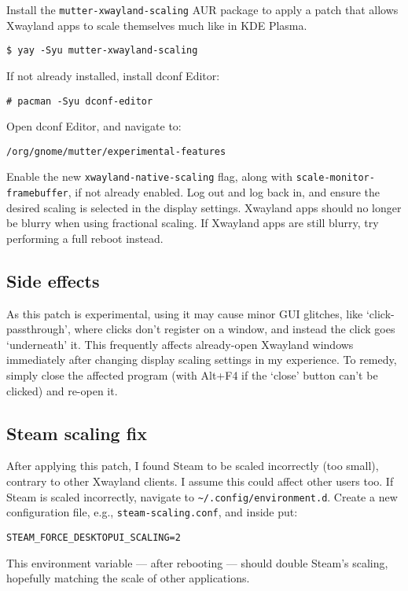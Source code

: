\documentclass[a4paper]{article}
\begin{document}
Install the \lstinline|mutter-xwayland-scaling| AUR package to apply a patch that allows Xwayland apps to scale themselves much like in KDE Plasma.
\begin{lstlisting}
$ yay -Syu mutter-xwayland-scaling
\end{lstlisting}

If not already installed, install dconf Editor:
\begin{lstlisting}
# pacman -Syu dconf-editor
\end{lstlisting}
Open dconf Editor, and navigate to:
\begin{lstlisting}
/org/gnome/mutter/experimental-features
\end{lstlisting}
Enable the new \lstinline|xwayland-native-scaling| flag, along with \lstinline|scale-monitor-framebuffer|, if not already enabled.
Log out and log back in, and ensure the desired scaling is selected in the display settings.
Xwayland apps should no longer be blurry when using fractional scaling.
If Xwayland apps are still blurry, try performing a full reboot instead.

\subsection{Side effects}

As this patch is experimental, using it may cause minor GUI glitches, like `click-passthrough', where clicks don't register on a window, and instead the click goes `underneath' it.
This frequently affects already-open Xwayland windows immediately after changing display scaling settings in my experience.
To remedy, simply close the affected program (with Alt+F4 if the `close' button can't be clicked) and re-open it.

\subsection{Steam scaling fix}

After applying this patch, I found Steam to be scaled incorrectly (too small), contrary to other Xwayland clients.
I assume this could affect other users too.
If Steam is scaled incorrectly, navigate to \lstinline|~/.config/environment.d|.
Create a new configuration file, e.g., \lstinline|steam-scaling.conf|, and inside put:
\begin{lstlisting}
STEAM_FORCE_DESKTOPUI_SCALING=2
\end{lstlisting}
This environment variable --- after rebooting --- should double Steam's scaling, hopefully matching the scale of other applications.
\end{document}
